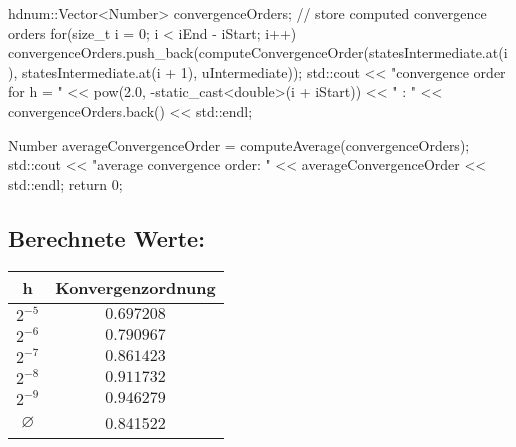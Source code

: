 \documentclass[10pt,oneside,a4paper]{scrartcl}
\begin{document}
\begin{cppcode}
{    hdnum::Vector<Number> convergenceOrders;     // store computed convergence orders
    for(size_t i = 0; i < iEnd - iStart; i++) {
      convergenceOrders.push_back(computeConvergenceOrder(statesIntermediate.at(i), statesIntermediate.at(i + 1), uIntermediate));
      std::cout << "convergence order for h = " << pow(2.0, -static_cast<double>(i + iStart)) << " : " << convergenceOrders.back() << std::endl;
    }

    Number averageConvergenceOrder = computeAverage(convergenceOrders);
    std::cout << "average convergence order: " << averageConvergenceOrder << std::endl;
    return 0;
}
    \end{cppcode}
    
    \subsection*{Berechnete Werte:}
    
    \begin{tabular}[htbp]{c|c}
    h & Konvergenzordnung \\
    \hline
    $2^{-5}$ & $0.697208$ \\
    $2^{-6}$ & $0.790967$ \\
    $2^{-7}$ & $0.861423$ \\
    $2^{-8}$ & $0.911732$ \\
    $2^{-9}$ & $0.946279$ \\
    \hline
    \hline
    $\varnothing$ & 0.841522

    \end{tabular}
\end{document}
